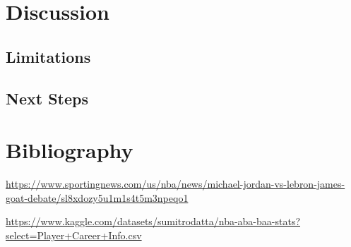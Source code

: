 \documentclass[
  11pt,
]{article}
\begin{document}
\section{Discussion}\label{discussion}

\subsection{Limitations}\label{limitations}

\subsection{Next Steps}\label{next-steps}

\section{Bibliography}\label{bibliography}

\url{https://www.sportingnews.com/us/nba/news/michael-jordan-vs-lebron-james-goat-debate/sl8xdozy5u1m1s4t5m3npeqo1}

\url{https://www.kaggle.com/datasets/sumitrodatta/nba-aba-baa-stats?select=Player+Career+Info.csv}
\end{document}
